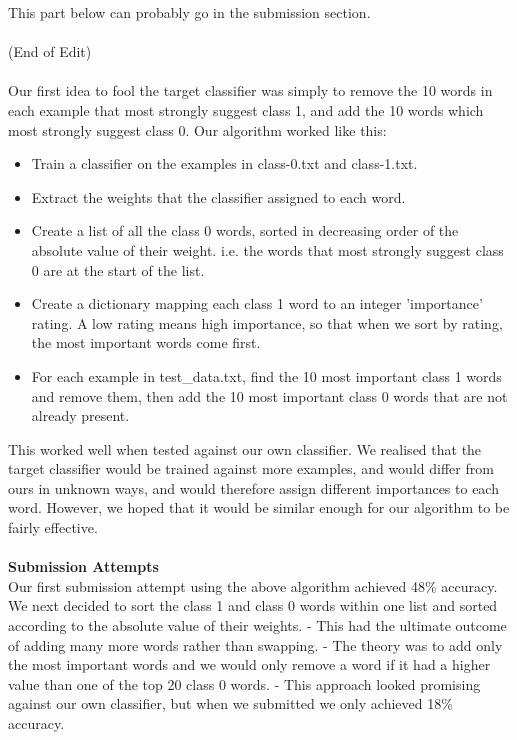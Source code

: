 \documentclass{article}
\begin{document}
{\large This part below can probably go in the submission section. \\ \\ (End of Edit) } \\ \\
Our first idea to fool the target classifier was simply to remove the 10 words in each example that most strongly suggest class 1, and add the 10 words which most strongly suggest class 0. Our algorithm worked like this:
\begin{itemize}
  \item{Train a classifier on the examples in class-0.txt and class-1.txt.}
  \item{Extract the weights that the classifier assigned to each word.}
  \item{Create a list of all the class 0 words, sorted in decreasing order of the absolute value of their weight. i.e. the words that most strongly suggest class 0 are at the start of the list.}
  \item{Create a dictionary mapping each class 1 word to an integer 'importance' rating. A low rating means high importance, so that when we sort by rating, the most important words come first.}
  \item{For each example in test\_data.txt, find the 10 most important class 1 words and remove them, then add the 10 most important class 0 words that are not already present.}
\end{itemize}
This worked well when tested against our own classifier. We realised that the target classifier would be trained against more examples, and would differ from ours in unknown ways, and would therefore assign different importances to each word. However, we hoped that it would be similar enough for our algorithm to be fairly effective. \\ \\
\textbf{\large Submission Attempts} \\
 Our first submission attempt using the above algorithm achieved 48\% accuracy. \\
 We next decided to sort the class 1 and class 0 words within one list and sorted according to the absolute value of their weights.
 - This had the ultimate outcome of adding many more words rather than swapping. 
 - The theory was to add only the most important words and we would only remove a word if it had a higher value than one of the top 20 class 0 words.
 - This approach looked promising against our own classifier, but when we submitted we only achieved 18\% accuracy.
\end{document}
